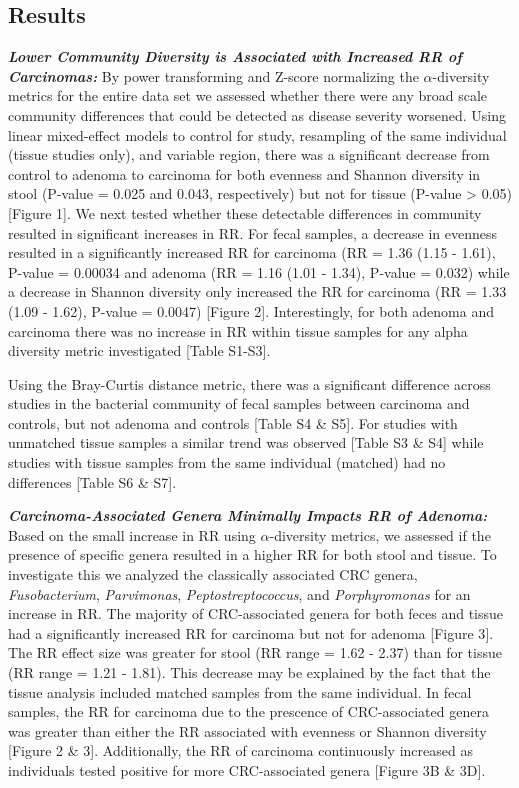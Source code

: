\documentclass[12pt,]{article}
\begin{document}
\newpage

\subsection{Results}\label{results}

\textbf{\emph{Lower Community Diversity is Associated with Increased RR
of Carcinomas:}} By power transforming and Z-score normalizing the
\(\alpha\)-diversity metrics for the entire data set we assessed whether
there were any broad scale community differences that could be detected
as disease severity worsened. Using linear mixed-effect models to
control for study, resampling of the same individual (tissue studies
only), and variable region, there was a significant decrease from
control to adenoma to carcinoma for both evenness and Shannon diversity
in stool (P-value = 0.025 and 0.043, respectively) but not for tissue
(P-value \textgreater{} 0.05) {[}Figure 1{]}. We next tested whether
these detectable differences in community resulted in significant
increases in RR. For fecal samples, a decrease in evenness resulted in a
significantly increased RR for carcinoma (RR = 1.36 (1.15 - 1.61),
P-value = 0.00034 and adenoma (RR = 1.16 (1.01 - 1.34), P-value = 0.032)
while a decrease in Shannon diversity only increased the RR for
carcinoma (RR = 1.33 (1.09 - 1.62), P-value = 0.0047) {[}Figure 2{]}.
Interestingly, for both adenoma and carcinoma there was no increase in
RR within tissue samples for any alpha diversity metric investigated
{[}Table S1-S3{]}.

Using the Bray-Curtis distance metric, there was a significant
difference across studies in the bacterial community of fecal samples
between carcinoma and controls, but not adenoma and controls {[}Table S4
\& S5{]}. For studies with unmatched tissue samples a similar trend was
observed {[}Table S3 \& S4{]} while studies with tissue samples from the
same individual (matched) had no differences {[}Table S6 \& S7{]}.

\textbf{\emph{Carcinoma-Associated Genera Minimally Impacts RR of
Adenoma:}} Based on the small increase in RR using \(\alpha\)-diversity
metrics, we assessed if the presence of specific genera resulted in a
higher RR for both stool and tissue. To investigate this we analyzed the
classically associated CRC genera, \emph{Fusobacterium},
\emph{Parvimonas}, \emph{Peptostreptococcus}, and \emph{Porphyromonas}
for an increase in RR. The majority of CRC-associated genera for both
feces and tissue had a significantly increased RR for carcinoma but not
for adenoma {[}Figure 3{]}. The RR effect size was greater for stool (RR
range = 1.62 - 2.37) than for tissue (RR range = 1.21 - 1.81). This
decrease may be explained by the fact that the tissue analysis included
matched samples from the same individual. In fecal samples, the RR for
carcinoma due to the prescence of CRC-associated genera was greater than
either the RR associated with evenness or Shannon diversity {[}Figure 2
\& 3{]}. Additionally, the RR of carcinoma continuously increased as
individuals tested positive for more CRC-associated genera {[}Figure 3B
\& 3D{]}.
\end{document}
